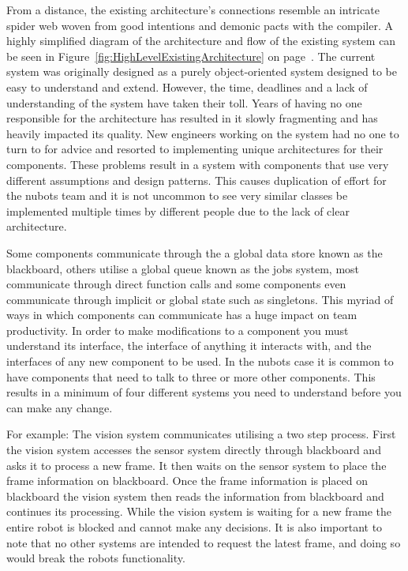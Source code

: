 \documentclass[english,12pt]{scrartcl}
\begin{document}
			From a distance, the existing architecture's connections resemble an intricate spider web
			woven from good intentions and demonic pacts with the compiler.
			A highly simplified diagram of the architecture and flow of the existing system can be seen in Figure~\ref{fig:HighLevelExistingArchitecture} on page~\pageref{fig:HighLevelExistingArchitecture}.
			The current system was originally designed as a purely object-oriented system designed to be easy to understand and extend.
			However, the time, deadlines and a lack of understanding of the system have taken their toll. 
			Years of having no one responsible for the architecture has resulted in it slowly fragmenting and has heavily impacted its quality.
			New engineers working on the system had no one to turn to for advice and resorted to implementing unique architectures for their components.
			These problems result in a system with components that use very different assumptions and design patterns.
			This causes duplication of effort for the \gls{nubots} team and it is not uncommon to see very similar classes be implemented multiple times by different people due to the lack of clear architecture.

			Some components communicate through the a global data store known as the blackboard, others utilise a global queue known as the jobs system, most communicate through direct function calls and some components even communicate through implicit or global state such as singletons.
			This myriad of ways in which components can communicate has a huge impact on team productivity.
			In order to make modifications to a component you must understand its interface, the interface of anything it interacts with, and the interfaces of any new component to be used.
			In the \gls{nubots} case it is common to have components that need to talk to three or more other components. This results in a minimum of four different systems you need to understand before you can make any change.

			For example: The vision system communicates utilising a two step process.
			First the vision system accesses the sensor system directly through blackboard and asks it to process a new frame.
			It then waits on the sensor system to place the frame information on blackboard.
			Once the frame information is placed on blackboard the vision system then reads the information
			from blackboard and continues its processing.
			While the vision system is waiting for a new frame the entire robot is blocked and cannot make any decisions.
			It is also important to note that no other systems are intended to request the latest frame, and doing so would break the robots functionality.
\end{document}
